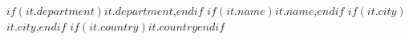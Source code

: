 $if(it.department)$$it.department$,$endif$ $if(it.name)$$it.name$,$endif$ $if(it.city)$$it.city$,$endif$ $if(it.country)$$it.country$$endif$